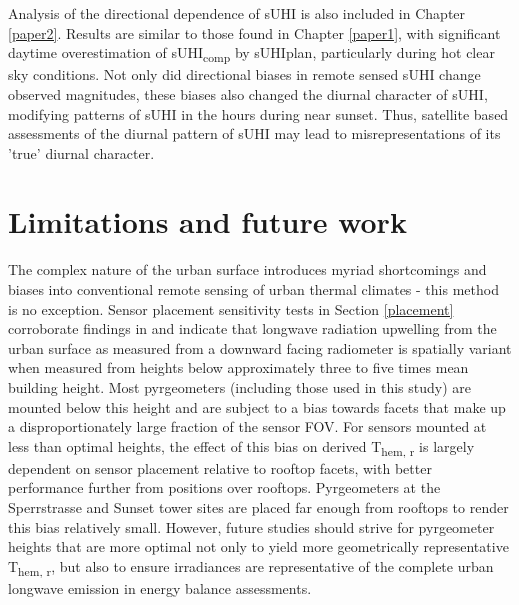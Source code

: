 \begin{bibunit}
Analysis of the directional dependence of sUHI is also included in Chapter \ref{paper2}. Results are similar to those found in Chapter \ref{paper1}, with significant daytime overestimation of sUHI\textsubscript{comp} by sUHI{plan}, particularly during hot clear sky conditions. Not only did directional biases in remote sensed sUHI change observed magnitudes, these biases also changed the diurnal character of sUHI, modifying patterns of sUHI in the hours during near sunset. Thus, satellite based assessments of the diurnal pattern of sUHI may lead to misrepresentations of its 'true' diurnal character. 

\section{Limitations and future work}


The complex nature of the urban surface introduces myriad shortcomings and biases into conventional remote sensing of urban thermal climates - this method is no exception. Sensor placement sensitivity tests in Section \ref{placement} corroborate findings in \citet{Roberts2010,Adderley2015} and indicate that longwave radiation upwelling from the urban surface as measured from a downward facing radiometer is spatially variant when measured from heights below approximately three to five times mean building height. Most pyrgeometers (including those used in this study) are mounted below this height and are subject to a bias towards facets that make up a disproportionately large fraction of the sensor FOV. For sensors mounted at less than optimal heights, the effect of this bias on derived T\textsubscript{hem, r} is largely dependent on sensor placement relative to rooftop facets, with better performance further from positions over rooftops. Pyrgeometers at the Sperrstrasse and Sunset tower sites are placed far enough from rooftops to render this bias relatively small. However, future studies should strive for pyrgeometer heights that are more optimal not only to yield more geometrically representative T\textsubscript{hem, r}, but also to ensure irradiances are representative of the complete urban longwave emission in energy balance assessments.


\end{bibunit}
